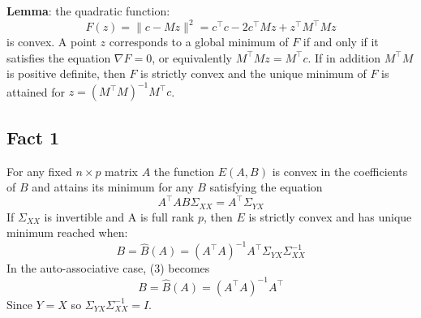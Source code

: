 \textbf{Lemma}: the quadratic function:
\[F(z) = \|c - Mz\|^2 = c^\intercal c - 2c^\intercal Mz + z^\intercal M^\intercal M z\]
is convex. A point $z$ corresponds to a global minimum of $F$ if and only if it satisfies the equation $\nabla F = 0$, or equivalently $M^\intercal M z = M^\intercal c$. If in addition $M^\intercal M$ is positive definite, then $F$ is strictly convex and the unique minimum of $F$ is attained for $z = (M^\intercal M)^{-1} M^\intercal c$.
    

\subsection{Fact 1}
For any fixed $n \times p$ matrix $A$ the function $E(A,B)$ is convex in the coefficients of $B$ and attains its minimum for any $B$ satisfying the equation
\begin{equation}
    A^\intercal AB\Sigma_{XX} = A^\intercal \Sigma_{YX}
\end{equation}
If $\Sigma_{XX}$ is invertible and A is full rank $p$, then $E$ is strictly convex and has unique minimum reached when:
\begin{equation}\tag{3}
    B = \hat{B}(A) = (A^\intercal A)^{-1} A^\intercal \Sigma_{YX}\Sigma_{XX}^{-1}
\end{equation}
In the auto-associative case, (3) becomes 
\begin{equation}\tag{3'}
    B = \hat{B}(A) = (A^\intercal A)^{-1} A^\intercal 
\end{equation}
Since $Y=X$ so $\Sigma_{YX}\Sigma_{XX}^{-1} = I$.

